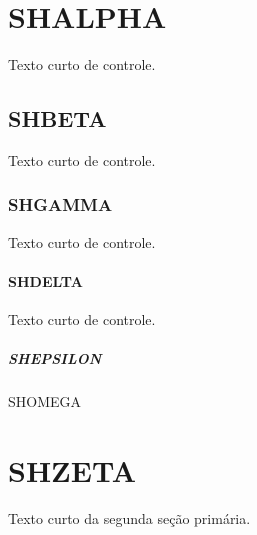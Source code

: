 \documentclass{abntexto-ufc}
\begin{document}
\textual

\section{SHALPHA}
Texto curto de controle.

\subsection{SHBETA}
Texto curto de controle.

\subsubsection{SHGAMMA}
Texto curto de controle.

\paragraph{SHDELTA}
Texto curto de controle.

\subparagraph{SHEPSILON}
SHOMEGA

\section{SHZETA}
Texto curto da segunda seção primária.
\end{document}
